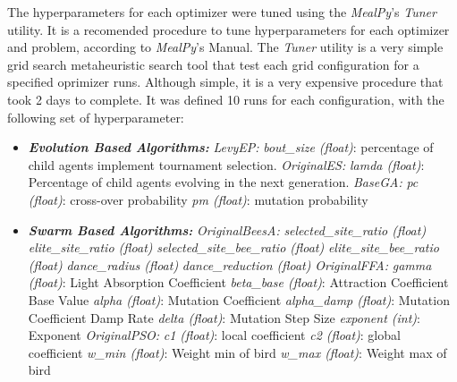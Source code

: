 \documentclass[conference]{IEEEtran}
\begin{document}
The hyperparameters for each optimizer were tuned using the \textit{MealPy}'s \textit{Tuner} utility.
It is a recomended procedure to tune hyperparameters for each optimizer and problem, according to
\textit{MealPy}'s Manual.
The \textit{Tuner} utility is a very simple grid search metaheuristic search tool
that test each grid configuration for a specified oprimizer runs.
Although simple, it is a very expensive procedure that took 2 days to complete. It was defined 10 runs for each
configuration, with the following set of hyperparameter:

\begin{itemize}
    \item \textit{\textbf{Evolution Based Algorithms: }}
        \subitem \textit{LevyEP:}
            \subsubitem \textit{bout\_size (float)}: percentage of child agents implement tournament selection.
        \subitem \textit{OriginalES:}
            \subsubitem \textit{lamda (float)}: Percentage of child agents evolving in the next generation.
        \subitem \textit{BaseGA:}
            \subsubitem \textit{pc (float)}: cross-over probability
            \subsubitem \textit{pm (float)}: mutation probability
    \item \textit{\textbf{Swarm Based Algorithms: }}
        \subitem \textit{OriginalBeesA:}
            \subsubitem \textit{selected\_site\_ratio (float)}
            \subsubitem \textit{elite\_site\_ratio (float)}
            \subsubitem \textit{selected\_site\_bee\_ratio (float)}
            \subsubitem \textit{elite\_site\_bee\_ratio (float)}
            \subsubitem \textit{dance\_radius (float)}
            \subsubitem \textit{dance\_reduction (float)}
        \subitem \textit{OriginalFFA:}
            \subsubitem \textit{gamma (float)}: Light Absorption Coefficient
            \subsubitem \textit{beta\_base (float)}: Attraction Coefficient Base Value
            \subsubitem \textit{alpha (float)}: Mutation Coefficient
            \subsubitem \textit{alpha\_damp (float)}: Mutation Coefficient Damp Rate
            \subsubitem \textit{delta (float)}: Mutation Step Size
            \subsubitem \textit{exponent (int)}: Exponent
        \subitem \textit{OriginalPSO:}
            \subsubitem \textit{c1 (float)}: local coefficient
            \subsubitem \textit{c2 (float)}: global coefficient
            \subsubitem \textit{w\_min (float)}: Weight min of bird
            \subsubitem \textit{w\_max (float)}: Weight max of bird

\end{itemize}
\end{document}
